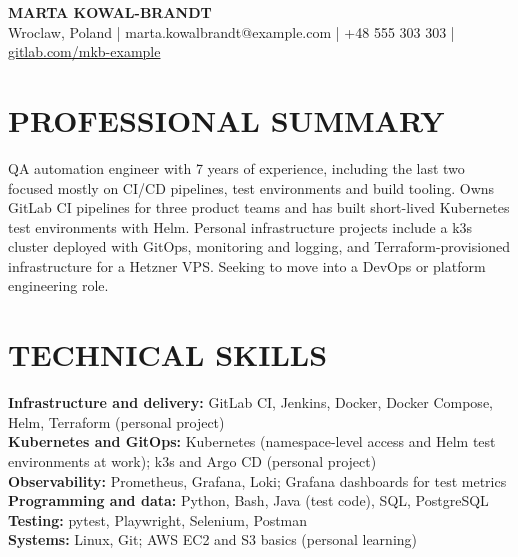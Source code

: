 \documentclass[11pt,a4paper]{article}
\begin{document}
\begin{center}
{\Huge\bfseries\color{primarycolor} MARTA KOWAL-BRANDT}\\[0.45em]
{\small Wroclaw, Poland | marta.kowalbrandt@example.com | +48 555 303 303 | \href{https://gitlab.com/mkb-example}{gitlab.com/mkb-example}}
\end{center}

\section*{PROFESSIONAL SUMMARY}
QA automation engineer with 7 years of experience, including the last two focused mostly on CI/CD pipelines, test environments and build tooling. Owns GitLab CI pipelines for three product teams and has built short-lived Kubernetes test environments with Helm. Personal infrastructure projects include a k3s cluster deployed with GitOps, monitoring and logging, and Terraform-provisioned infrastructure for a Hetzner VPS. Seeking to move into a DevOps or platform engineering role.

\section*{TECHNICAL SKILLS}
\textbf{Infrastructure and delivery:} GitLab CI, Jenkins, Docker, Docker Compose, Helm, Terraform (personal project)\\
\textbf{Kubernetes and GitOps:} Kubernetes (namespace-level access and Helm test environments at work); k3s and Argo CD (personal project)\\
\textbf{Observability:} Prometheus, Grafana, Loki; Grafana dashboards for test metrics\\
\textbf{Programming and data:} Python, Bash, Java (test code), SQL, PostgreSQL\\
\textbf{Testing:} pytest, Playwright, Selenium, Postman\\
\textbf{Systems:} Linux, Git; AWS EC2 and S3 basics (personal learning)
\end{document}
